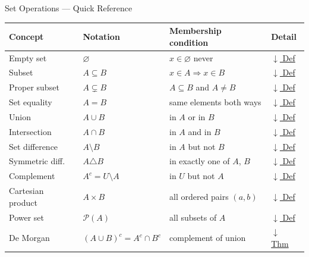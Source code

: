 \begin{toolkitbox}{Set Operations --- Quick Reference}
\small
\begin{tabular}{l l l l}
\toprule
\textbf{Concept} & \textbf{Notation} & \textbf{Membership condition} & \textbf{Detail} \\
\midrule
Empty set        & $\varnothing$             & $x \in \varnothing$ never         & \hyperref[def:empty-set]{$\downarrow$ Def} \\
Subset           & $A \subseteq B$           & $x \in A \Rightarrow x \in B$     & \hyperref[def:subset]{$\downarrow$ Def} \\
Proper subset    & $A \subsetneq B$          & $A \subseteq B$ and $A \neq B$    & \hyperref[def:proper-subset]{$\downarrow$ Def} \\
Set equality     & $A = B$                   & same elements both ways            & \hyperref[def:set-equality]{$\downarrow$ Def} \\
Union            & $A \cup B$                & in $A$ or in $B$                  & \hyperref[def:union]{$\downarrow$ Def} \\
Intersection     & $A \cap B$                & in $A$ and in $B$                 & \hyperref[def:intersection]{$\downarrow$ Def} \\
Set difference   & $A \setminus B$           & in $A$ but not $B$                & \hyperref[def:set-difference]{$\downarrow$ Def} \\
Symmetric diff.  & $A \triangle B$           & in exactly one of $A$, $B$        & \hyperref[def:sym-diff]{$\downarrow$ Def} \\
Complement       & $A^c = U \setminus A$     & in $U$ but not $A$                & \hyperref[def:complement]{$\downarrow$ Def} \\
Cartesian product& $A \times B$              & all ordered pairs $(a,b)$         & \hyperref[def:cartesian-product]{$\downarrow$ Def} \\
Power set        & $\mathcal{P}(A)$          & all subsets of $A$                & \hyperref[def:power-set]{$\downarrow$ Def} \\
De Morgan        & $(A \cup B)^c = A^c \cap B^c$ & complement of union        & \hyperref[thm:de-morgan]{$\downarrow$ Thm} \\
\bottomrule
\end{tabular}
\end{toolkitbox}



